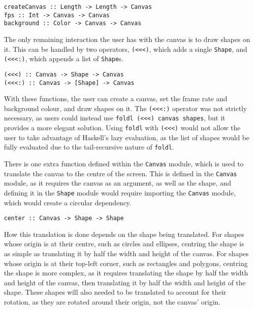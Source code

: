 \documentclass[../main.tex]{subfiles}
\begin{document}
        \begin{lstlisting}[label={lst:fps}, caption={The createCanvas, fps and backgrounds function.}]
createCanvas :: Length -> Length -> Canvas
fps :: Int -> Canvas -> Canvas
background :: Color -> Canvas -> Canvas\end{lstlisting}

        The only remaining interaction the user has with the canvas is to draw shapes
            on it.
        This can be handled by two operators, \verb|(<<<)|, which adds a single
            \verb|Shape|, and \verb|(<<<:)|, which appends a list of \verb|Shape|s.

        \begin{lstlisting}[label={lst:<<<}, caption={The operators to append a frame to the canvas.}]
(<<<) :: Canvas -> Shape -> Canvas
(<<<:) :: Canvas -> [Shape] -> Canvas\end{lstlisting}

        With these functions, the user can create a canvas, set the frame rate and
            background colour, and draw shapes on it.
        The \verb|(<<<:)| operator was not strictly necessary, as users could instead
            use \verb|foldl (<<<) canvas shapes|, but it provides a more elegant solution.
        Using \verb|foldl| with \verb|(<<<)| would not allow the user to take advantage
            of Haskell's lazy evaluation, as the list of shapes would be fully evaluated
            due to the tail-recursive nature of \verb|foldl|.

        There is one extra function defined within the \verb|Canvas| module, which is
            used to translate the canvas to the centre of the screen.
        This is defined in the \verb|Canvas| module, as it requires the canvas as an
            argument, as well as the shape, and defining it in the \verb|Shape| module
            would require importing the \verb|Canvas| module, which would create a circular
            dependency.

        \begin{lstlisting}[label={lst:centre}, caption={The centre function.}]
center :: Canvas -> Shape -> Shape\end{lstlisting}

        How this translation is done depends on the shape being translated.
        For shapes whose origin is at their centre, such as circles and ellipses,
            centring the shape is as simple as translating it by half the width and height
            of the canvas.
        For shapes whose origin is at their top-left corner, such as rectangles and
            polygons, centring the shape is more complex, as it requires translating the
            shape by half the width and height of the canvas, then translating it by half
            the width and height of the shape.
        These shapes will also needed to be translated to account for their rotation,
            as they are rotated around their origin, not the canvas' origin.
\end{document}
